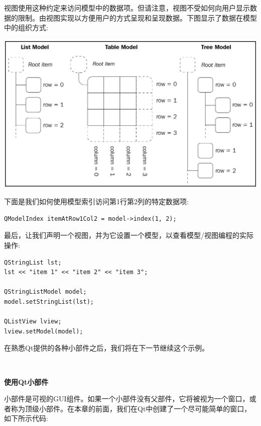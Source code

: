 视图使用这种约定来访问模型中的数据项。但请注意，视图不受如何向用户显示数据的限制。由视图实现以方便用户的方式呈现和呈现数据。下图显示了数据在模型中的组织方式: \par

\begin{center}
	\includegraphics[width=1.0\textwidth]{content/Section-2/Chapter-14/11}
\end{center}

下面是我们如何使用模型索引访问第1行第2列的特定数据项: \par

\begin{lstlisting}[caption={}]
QModelIndex itemAtRow1Col2 = model->index(1, 2);
\end{lstlisting}

最后，让我们声明一个视图，并为它设置一个模型，以查看模型/视图编程的实际操作: \par

\begin{lstlisting}[caption={}]
QStringList lst;
lst << "item 1" << "item 2" << "item 3";

QStringListModel model;
model.setStringList(lst);

QListView lview;
lview.setModel(model);
\end{lstlisting}

在熟悉Qt提供的各种小部件之后，我们将在下一节继续这个示例。 \par

\noindent\textbf{}\ \par
\textbf{使用Qt小部件} \ \par
小部件是可视的GUI组件。如果一个小部件没有父部件，它将被视为一个窗口，或者称为顶级小部件。在本章的前面，我们在Qt中创建了一个尽可能简单的窗口，如下所示代码: \par

